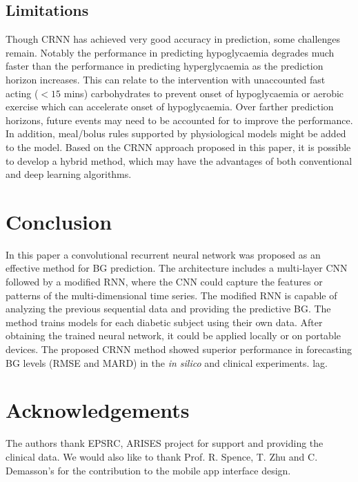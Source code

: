 \documentclass[a4paper, 10 pt, twocolumn]{IEEEtran}
\begin{document}
\subsection{Limitations}
Though CRNN has achieved very good accuracy in prediction, some challenges remain. Notably the performance in predicting hypoglycaemia degrades much faster than the performance in predicting hyperglycaemia as the
prediction horizon increases. This can relate to the intervention with unaccounted fast acting  {($<15$ mins)} carbohydrates to prevent onset of hypoglycaemia or aerobic exercise which can accelerate onset of
hypoglycaemia. Over farther prediction horizons, future events may need to be accounted for to improve the performance.
In addition,  {meal/bolus rules supported by physiological models might be added to the model.}
Based on the CRNN approach proposed in this paper, it is possible to develop a hybrid method, which may have the advantages of both conventional and  {deep learning} algorithms.

\section{Conclusion}
In this paper a convolutional recurrent neural network was proposed as an effective method for BG prediction. The architecture includes a multi-layer CNN followed by a modified RNN, where the CNN could capture the
features or patterns of the multi-dimensional time series. The modified RNN is capable of analyzing the previous sequential data and providing the predictive BG. The method trains models for each diabetic subject using
their own data.
After obtaining the trained neural network, it could be applied locally or on portable devices. The proposed CRNN method showed superior performance in forecasting BG levels (RMSE and MARD) in the \emph{in silico} and
clinical experiments.
lag.




\section{Acknowledgements}

The authors thank EPSRC, ARISES project for support and providing the clinical data. We would also like to thank Prof. R. Spence, T. Zhu and C. Demasson's for the contribution to the mobile app interface design. 
\end{document}
